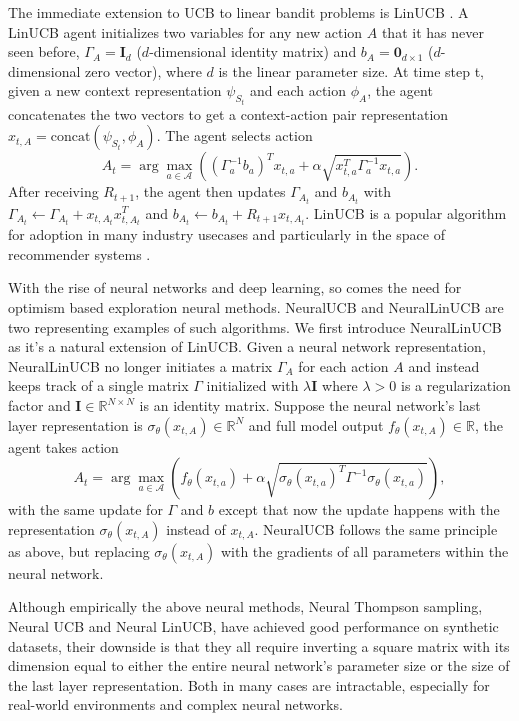The immediate extension to UCB to linear bandit problems is LinUCB \cite{li2010contextual, chu2011contextual}. A LinUCB agent initializes two variables for any new action $A$ that it has never seen before, $\Gamma_A = \mathbf{I}_d$ ($d$-dimensional identity matrix) and $b_A = \mathbf{0}_{d\times 1}$ ($d$-dimensional zero vector), where $d$ is the linear parameter size. At time step t, given a new context representation $\psi_{S_t}$ and each action $\phi_{A}$, the agent concatenates the two vectors to get a context-action pair representation $x_{t, A} = \text{concat}(\psi_{S_t}, \phi_A)$. The agent selects action
\begin{equation}
    A_t = \arg\max_{a \in \mathcal{A}}\left((\Gamma^{-1}_a b_a)^T x_{t, a} + \alpha \sqrt{x_{t, a}^T\Gamma_a^{-1}x_{t, a}}\right).
\end{equation}
After receiving $R_{t+1}$, the agent then updates $\Gamma_{A_t}$ and $b_{A_t}$ with $\Gamma_{A_t} \leftarrow \Gamma_{A_t} + x_{t, A_t}x_{t, A_t}^T$ and $b_{A_t} \leftarrow b_{A_t} + R_{t+1} x_{t, A_t}$. LinUCB is a popular algorithm for adoption in many industry usecases and particularly in the space of recommender systems \cite{li2010contextual, zhao2013interactive, qin2014contextual, wang2017biucb}. 

With the rise of neural networks and deep learning, so comes the need for optimism based exploration neural methods. NeuralUCB \cite{zhou2020neural} and NeuralLinUCB \cite{xu2021neural} are two representing examples of such algorithms. We first introduce NeuralLinUCB as it's a natural extension of LinUCB. Given a neural network representation, NeuralLinUCB no longer initiates a matrix $\Gamma_A$ for each action $A$ and instead keeps track of a single matrix $\Gamma$ initialized with $\lambda \mathbf{I}$ where $\lambda > 0$ is a regularization factor and $\mathbf{I} \in \mathbb{R}^{N \times N}$ is an identity matrix. Suppose the neural network's last layer representation is $\sigma_{\theta}(x_{t, A}) \in \mathbb{R}^N$ and full model output $f_\theta(x_{t, A}) \in \mathbb{R}$, the agent takes action
\begin{equation}
    A_t = \arg\max_{a \in \mathcal{A}}\left(f_{\theta}(x_{t, a}) + \alpha \sqrt{\sigma_{\theta}(x_{t, a})^T\Gamma^{-1}\sigma_{\theta}(x_{t, a})}\right),
\end{equation}
with the same update for $\Gamma$ and $b$ except that now the update happens with the representation $\sigma_\theta(x_{t,A})$ instead of $x_{t,A}$. NeuralUCB follows the same principle as above, but replacing $\sigma_{\theta}(x_{t,A})$ with the gradients of all parameters within the neural network. 

Although empirically the above neural methods, Neural Thompson sampling, Neural UCB and Neural LinUCB, have achieved good performance on synthetic datasets, their downside is that they all require inverting a square matrix with its dimension equal to either the entire neural network's parameter size or the size of the last layer representation. Both in many cases are intractable, especially for real-world environments and complex neural networks. 